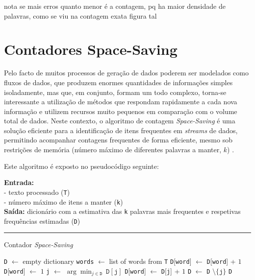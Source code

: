 \documentclass[mirror, portugues]{revdetua}
\begin{document}
nota se mais erros quanto menor é a contagem, pq ha maior densidade de palavras, como se viu na contagem exata figura tal


\section{Contadores Space-Saving}

Pelo facto de muitos processos de geração de dados poderem ser modelados como fluxos de dados, que produzem enormes quantidades de informações simples isoladamente, mas que, em conjunto, formam um todo complexo, torna-se interessante a utilização de métodos que respondam rapidamente a cada nova informação e utilizem recursos muito pequenos em comparação com o volume total de dados. Neste contexto, o algoritmo de contagem \textit{Space-Saving} é uma solução eficiente para a identificação de itens frequentes em \textit{streams} de dados, permitindo acompanhar contagens frequentes de forma eficiente, mesmo sob restrições de memória (número máximo de diferentes palavras a manter, $k$) \cite{CG09}.

Este algoritmo é exposto no pseudocódigo seguinte:

\begin{algorithm}[H]
\raggedright
\textbf{Entrada:} \\
- texto processado (\texttt{T}) \\
- número máximo de itens a manter (\texttt{k}) \\
\textbf{Saída:} dicionário com a estimativa das \texttt{k} palavras mais frequentes e respetivas frequências estimadas (\texttt{D}) \\
\hrule 
\caption{Contador \textit{Space-Saving} \cite{CG09}}
\begin{algorithmic}[1]
    \State \texttt{D} $\gets$ empty dictionary
    \State \texttt{words} $\gets$ list of words from \texttt{T}
            \State \texttt{D}[\texttt{word}] $\gets$ \texttt{D}[\texttt{word}] + $1$
            \State \texttt{D}[\texttt{word}] $\gets$ $1$
        \Else
            \State \texttt{j} $\gets$ $\arg \min_{j \in \texttt{D}}\ \texttt{D}[\texttt{j}]$
            \State \texttt{D}[\texttt{word}] $\gets$ \texttt{D}[\texttt{j}] + $1$
            \State \texttt{D} $\gets$ \texttt{D} $\setminus \{\texttt{j}\}$
        \EndIf
    \EndFor
    \State \Return \texttt{D}
\end{algorithmic}
\end{algorithm}
\end{document}
